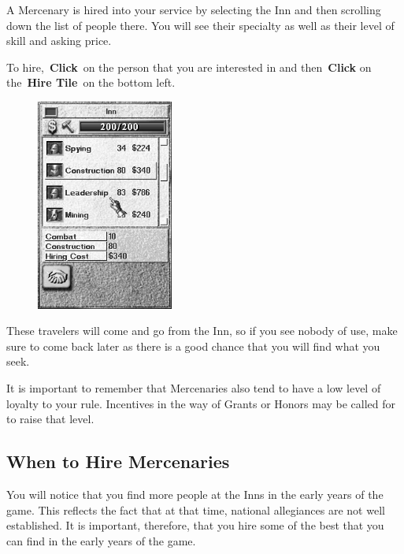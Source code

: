 A Mercenary is hired into your service by selecting the Inn and then scrolling down the list of people there. You will see their specialty as well as their level of skill and asking price.

\clearpage

To hire, \textbf{Click} on the person that you are interested in and then \textbf{Click} on the \textbf{Hire Tile} on the bottom left.

\begin{figure}
	\vspace{-20pt}
	\begin{center}
		\includegraphics[width=0.4\textwidth]{Iinninfo}
	\end{center}
	\vspace{-20pt}
\end{figure}

These travelers will come and go from the Inn, so if you see nobody of use, make sure to come back later as there is a good chance that you will find what you seek.

It is important to remember that Mercenaries also tend to have a low level of loyalty to your rule. Incentives in the way of Grants or Honors may be called for to raise that level.

\clearpage

\subsection{When to Hire Mercenaries}

You will notice that you find more people at the Inns in the early years of the game. This reflects the fact that at that time, national allegiances are not well established. It is important, therefore, that you hire some of the best that you can find in the early years of the game.

